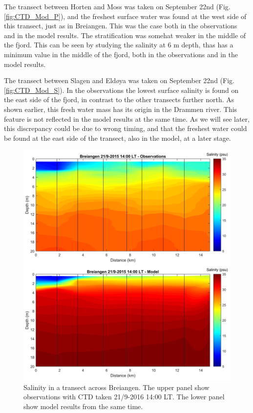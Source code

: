 \documentclass[12pt,a4paper,english]{article}
\begin{document}
The transect between Horten and Moss was taken on September 22nd (Fig. \ref{fig:CTD_Mod_P}), and the freshest surface water was found at the west side of this transect, just as in Breiangen.
This was the case both in the observations and in the model results.
The stratification was somehat weaker in the middle of the fjord.
This can be seen by studying the salinity at 6 m depth, thas has a minimum value in the 
middle of the fjord, both in the observations and in the model results.

The transect between Slagen and Eld{\o}ya was taken on September 22nd (Fig. \ref{fig:CTD_Mod_S}).
In the observations the lowest surface salinity is found on the east side of the fjord,
in contrast to the other transects further north.
As shown earlier, this fresh water mass has its origin in the Drammen river.
This feature is not reflected in the model results at the same time.
As we will see later, this discrepancy could be due to wrong timing, and that the freshest 
water could be found at the east side of the transect, also in the model, at a later stage.  

\begin{figure}[ht]
\centerline{
\includegraphics*[width=\textwidth]{Figurer/Transect_M_no1_salt.png}}
\caption{\small
Salinity in a transect across Breiangen. 
The upper panel show observations with CTD taken
21/9-2016 14:00 LT. The lower panel show model results from the same time.}
\label{fig:CTD_Mod_M1}
\end{figure}
\end{document}
